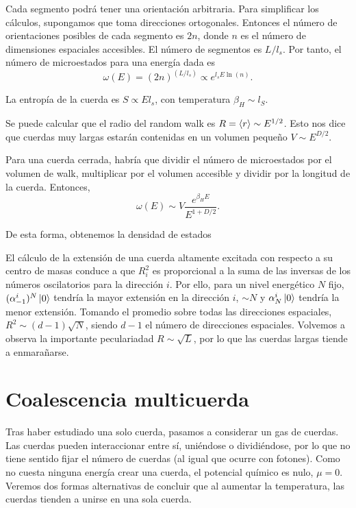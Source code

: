 Cada segmento podrá tener una orientación arbitraria. Para simplificar los cálculos,
supongamos que toma direcciones ortogonales. Entonces el número de orientaciones posibles
de cada segmento es $2n$, donde $n$ es el número de dimensiones espaciales accesibles.
El número de segmentos es $L/l_s$.
Por tanto, el número de microestados para una energía dada es
\begin{equation}
  \omega(E)=(2n)^{(L/l_s)}\propto e^{l_s E \ln (n)}.
\end{equation}

La entropía de la cuerda es $S\propto El_s$, con temperatura $\beta_H\sim l_S$.

Se puede calcular que el radio del random walk es $R=\expval{r}\sim E^{1/2}$. Esto
nos dice que cuerdas muy largas estarán contenidas en un volumen pequeño $V\sim E^{D/2}$.

Para una cuerda cerrada, habría que dividir el número de microestados por el 
volumen de walk, multiplicar por el volumen accesible y dividir por la longitud de la cuerda.
Entonces,
\begin{equation}
  \omega(E)\sim V \frac{e^{\beta_H E}}{E^{1+D/2}}.
\end{equation}

De esta forma, obtenemos la densidad de estados 

El cálculo de la extensión de una cuerda altamente excitada con respecto a su centro de masas 
conduce a que $R^2_i$ es proporcional a la suma de las inversas de los números oscilatorios para
la dirección $i$.
Por ello, para un nivel energético $N$ fijo, $(\alpha^i_{-1})^N\ket{0}$ tendría la mayor extensión en la dirección $i$, $\sim N$ y
$\alpha^i_N\ket{0}$ tendría la menor extensión.
Tomando el promedio sobre todas las direcciones espaciales, $R^2\sim (d-1)\sqrt{N}$, siendo
$d-1$ el número de direcciones espaciales. Volvemos a  observa la importante peculariadad $R\sim \sqrt{L}$,
por lo que las cuerdas largas tiende a enmarañarse.

\section{Coalescencia multicuerda}

Tras haber estudiado una solo cuerda, pasamos a considerar un gas de cuerdas.
Las cuerdas pueden interaccionar entre sí, uniéndose o dividiéndose, por lo que
no tiene sentido fijar el número de cuerdas (al igual que ocurre con fotones).
Como no cuesta ninguna energía crear una cuerda, el potencial químico es nulo, $\mu=0$.
Veremos dos formas alternativas de concluir que al aumentar la temperatura, las cuerdas
tienden a unirse en una sola cuerda.

